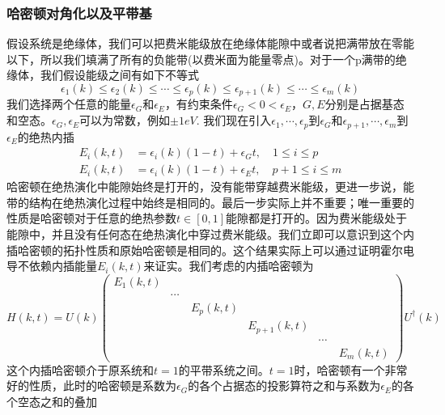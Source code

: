\documentclass{article}
\numberwithin{equation}{subsection}
\begin{document}
\subsubsection{哈密顿对角化以及平带基}
假设系统是绝缘体，我们可以把费米能级放在绝缘体能隙中或者说把满带放在零能以下，所以我们填满了所有的负能带(以费米面为能量零点)。对于一个p满带的绝缘体，我们假设能级之间有如下不等式
\begin{equation}
    \epsilon_1(k)\leq\epsilon_2(k)\leq\cdots\leq\epsilon_p(k)\leq\epsilon_{p+1}(k)\leq\cdots\leq\epsilon_m(k)
\end{equation}
我们选择两个任意的能量$\epsilon_G$和$\epsilon_E$，有约束条件$\epsilon_G<0<\epsilon_E$，$G,E$分别是占据基态和空态。$\epsilon_G,\epsilon_E$可以为常数，例如$\pm 1eV$. 我们现在引入$\epsilon_1,\cdots,\epsilon_p$到$\epsilon_G$和$\epsilon_{p+1},\cdots,\epsilon_m$到$\epsilon_E$的绝热内插
\begin{equation}
    \begin{split}
        E_i(k,t)&=\epsilon_i(k)(1-t)+\epsilon_Gt,\quad 1\leq i\leq p\\
        E_i(k,t)&=\epsilon_i(k)(1-t)+\epsilon_Et,\quad p+1\leq i\leq m
    \end{split}
\end{equation}
哈密顿在绝热演化中能隙始终是打开的，没有能带穿越费米能级，更进一步说，能带的结构在绝热演化过程中始终是相同的。最后一步实际上并不重要；唯一重要的性质是哈密顿对于任意的绝热参数$t\in[0,1]$能隙都是打开的。因为费米能级处于能隙中，并且没有任何态在绝热演化中穿过费米能级。我们立即可以意识到这个内插哈密顿的拓扑性质和原始哈密顿是相同的。这个结果实际上可以通过证明霍尔电导不依赖内插能量$E_i(k,t)$来证实。我们考虑的内插哈密顿为
\begin{equation}
    H(k,t)=U(k)\begin{pmatrix}
        E_1(k,t)&\quad&\quad&\quad&\quad&\quad\\
        \quad&\cdots&\quad&\quad&\quad&\quad\\
        \quad&\quad&E_p(k,t)&\quad&\quad&\quad\\
        \quad&\quad&\quad&E_{p+1}(k,t)&\quad&\quad\\
        \quad&\quad&\quad&\quad&\cdots&\quad\\
        \quad&\quad&\quad&\quad&\quad&E_m(k,t)
    \end{pmatrix}U^\dagger(k)
\end{equation}
这个内插哈密顿介于原系统和$t=1$的平带系统之间。$t=1$时，哈密顿有一个非常好的性质，此时的哈密顿是系数为$\epsilon_G$的各个占据态的投影算符之和与系数为$\epsilon_E$的各个空态之和的叠加
\end{document}
